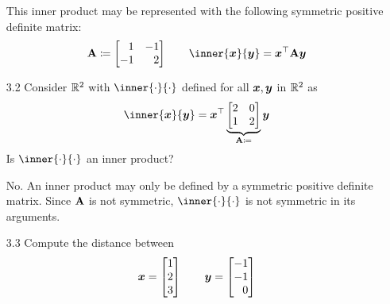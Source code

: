 \documentclass[11pt]{article}
\begin{document}
\begin{enumerate}
          This inner product may be represented with the following symmetric positive definite matrix:
          \[
              \begin{aligned}
                  \mat{A} \coloneq
                  \begin{bmatrix*}[r]
                      1  & -1 \\
                      -1 & 2  \\
                  \end{bmatrix*}
                  \qquad
                  \inner{\x}{\y} = \x^\top \mat{A} \y
              \end{aligned}
          \]

          \pagebreak

    \item[3.2] Consider $\mathbb{R}^2$ with $\inner{\cdot}{\cdot}$ defined for all $\boldsymbol{x}, \boldsymbol{y}$ in $\mathbb{R}^2$ as
          \[
              \inner{\x}{\y} = \x^\top
              \underbrace{
                  \begin{bmatrix}
                      2 & 0 \\
                      1 & 2 \\
                  \end{bmatrix}
              }_{
              \mat{A} \coloneq
              }
              \y
          \]
          Is $\inner{\cdot}{\cdot}$ an inner product?

          \vspace{1em}

          No.  An inner product may only be defined by a symmetric positive definite matrix.  Since $\mathbf{A}$ is
          not symmetric, $\inner{\cdot}{\cdot}$ is not symmetric in its arguments.

    \item[3.3] Compute the distance between
          \[
              \x =
              \begin{bmatrix}
                  1 \\ 2 \\ 3
              \end{bmatrix}
              \qquad
              \y =
              \begin{bmatrix*}[r]
                  -1 \\ -1 \\ 0
              \end{bmatrix*}
          \]


\end{enumerate}
\end{document}

